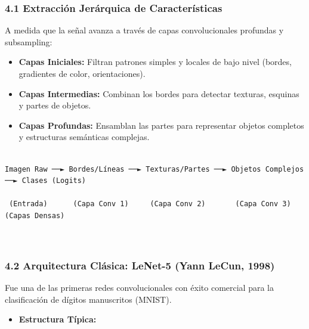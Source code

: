 \documentclass[11pt,oneside]{article}
\begin{document}
\subsubsection{4.1 Extracción Jerárquica de Características}

A medida que la señal avanza a través de capas convolucionales profundas y subsampling:

\begin{itemize}

\item \textbf{Capas Iniciales:} Filtran patrones simples y locales de bajo nivel (bordes, gradientes de color, orientaciones).

\end{itemize}

\begin{itemize}

\item \textbf{Capas Intermedias:} Combinan los bordes para detectar texturas, esquinas y partes de objetos.

\end{itemize}

\begin{itemize}

\item \textbf{Capas Profundas:} Ensamblan las partes para representar objetos completos y estructuras semánticas complejas.

\end{itemize}

\begin{lstlisting}

Imagen Raw ──► Bordes/Líneas ──► Texturas/Partes ──► Objetos Complejos ──► Clases (Logits)

 (Entrada)      (Capa Conv 1)     (Capa Conv 2)       (Capa Conv 3)     (Capas Densas)



\end{lstlisting}

\subsubsection{4.2 Arquitectura Clásica: LeNet-5 (Yann LeCun, 1998)}

Fue una de las primeras redes convolucionales con éxito comercial para la clasificación de dígitos manuscritos (MNIST).

\begin{itemize}

\item \textbf{Estructura Típica:}

\end{itemize}
\end{document}
